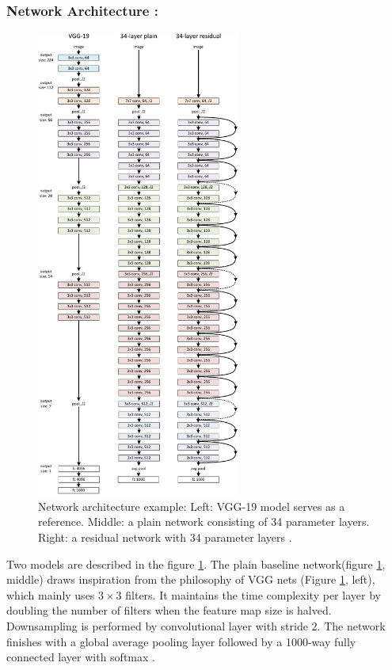 \subsubsection*{Network Architecture :}

\begin{figure}[H]
    \centering
    \includegraphics[width=0.6\textwidth]{Rohit_Master_Thesis//Images/resnet_arch.pdf}
    \caption{Network architecture example: Left: VGG-19 model serves as a reference. Middle: a plain network consisting of 34 parameter layers. Right: a residual network with 34 parameter layers \cite{he2016deep}.}
    \label{fig:resnet architecture}
\end{figure}

Two models are described in the figure \ref{fig:resnet architecture}. The plain baseline network(figure \ref{fig:resnet architecture}, middle) draws inspiration from the philosophy of VGG nets\cite{simonyan2015deepconvolutionalnetworkslargescale} (Figure \ref{fig:resnet architecture}, left), which mainly uses $3\times3$ filters. It maintains the time complexity per layer by doubling the number of filters when the feature map size is halved. Downsampling is performed by convolutional layer with stride 2. The network finishes with a global average pooling layer followed by a 1000-way fully connected layer with softmax \cite{he2016deep}.

